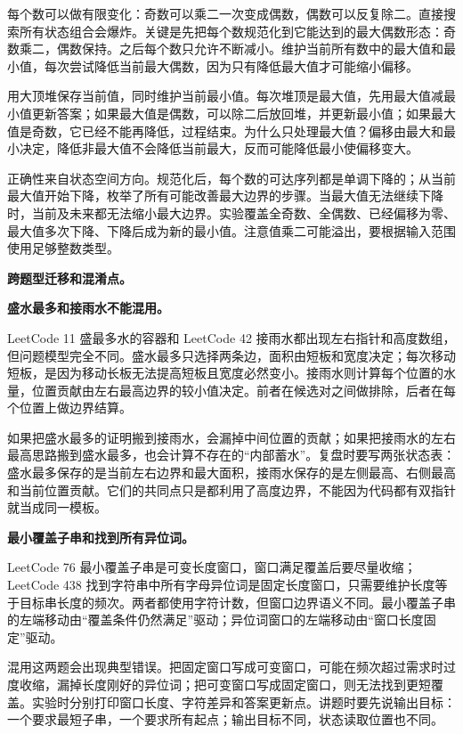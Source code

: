 每个数可以做有限变化：奇数可以乘二一次变成偶数，偶数可以反复除二。直接搜索所有状态组合会爆炸。关键是先把每个数规范化到它能达到的最大偶数形态：奇数乘二，偶数保持。之后每个数只允许不断减小。维护当前所有数中的最大值和最小值，每次尝试降低当前最大偶数，因为只有降低最大值才可能缩小偏移。

用大顶堆保存当前值，同时维护当前最小值。每次堆顶是最大值，先用最大值减最小值更新答案；如果最大值是偶数，可以除二后放回堆，并更新最小值；如果最大值是奇数，它已经不能再降低，过程结束。为什么只处理最大值？偏移由最大和最小决定，降低非最大值不会降低当前最大，反而可能降低最小使偏移变大。

正确性来自状态空间方向。规范化后，每个数的可达序列都是单调下降的；从当前最大值开始下降，枚举了所有可能改善最大边界的步骤。当最大值无法继续下降时，当前及未来都无法缩小最大边界。实验覆盖全奇数、全偶数、已经偏移为零、最大值多次下降、下降后成为新的最小值。注意值乘二可能溢出，要根据输入范围使用足够整数类型。

\noindent\textbf{跨题型迁移和混淆点。}

\noindent\textbf{盛水最多和接雨水不能混用。}

LeetCode 11 盛最多水的容器和 LeetCode 42 接雨水都出现左右指针和高度数组，但问题模型完全不同。盛水最多只选择两条边，面积由短板和宽度决定；每次移动短板，是因为移动长板无法提高短板且宽度必然变小。接雨水则计算每个位置的水量，位置贡献由左右最高边界的较小值决定。前者在候选对之间做排除，后者在每个位置上做边界结算。

如果把盛水最多的证明搬到接雨水，会漏掉中间位置的贡献；如果把接雨水的左右最高思路搬到盛水最多，也会计算不存在的“内部蓄水”。复盘时要写两张状态表：盛水最多保存的是当前左右边界和最大面积，接雨水保存的是左侧最高、右侧最高和当前位置贡献。它们的共同点只是都利用了高度边界，不能因为代码都有双指针就当成同一模板。

\noindent\textbf{最小覆盖子串和找到所有异位词。}

LeetCode 76 最小覆盖子串是可变长度窗口，窗口满足覆盖后要尽量收缩；LeetCode 438 找到字符串中所有字母异位词是固定长度窗口，只需要维护长度等于目标串长度的频次。两者都使用字符计数，但窗口边界语义不同。最小覆盖子串的左端移动由“覆盖条件仍然满足”驱动；异位词窗口的左端移动由“窗口长度固定”驱动。

混用这两题会出现典型错误。把固定窗口写成可变窗口，可能在频次超过需求时过度收缩，漏掉长度刚好的异位词；把可变窗口写成固定窗口，则无法找到更短覆盖。实验时分别打印窗口长度、字符差异和答案更新点。讲题时要先说输出目标：一个要求最短子串，一个要求所有起点；输出目标不同，状态读取位置也不同。

